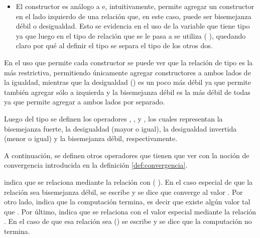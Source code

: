 \begin{itemize}[noitemsep]
\item El constructor  es análogo a  e, intuitivamente, permite agregar un constructor  en el lado izquierdo de una relación que, en este caso, puede ser bisemejanza débil o desigualdad. Esto se evidencia en el uso de la variable  que tiene tipo  ya que luego en el tipo de relación que se le pasa a  se utiliza ( ), quedando claro por qué al definir el tipo  se separa el tipo  de los otros dos. 
\end{itemize}

En el uso que permite cada constructor se puede ver que la relación de tipo  es la más restrictiva, permitiendo únicamente agregar constructores  a ambos lados de la igualdad, mientras que la desigualdad () es un poco más débil ya que permite también agregar sólo a izquierda y la bisemejanza débil es la más débil de todas ya que permite agregar a ambos lados por separado.

Luego del tipo  se definen los operadores \AgdaFunction{$\cong$}, \AgdaFunction{$\gtrsim$}, \AgdaFunction{$\lesssim$} y \AgdaFunction{$\approx$}, los cuales representan la bisemejanza fuerte, la desigualdad (mayor o igual), la desigualdad invertida (menor o igual) y la bisemejanza débil, respectivamente. 


A continuación, se definen otros operadores que tienen que ver con la noción de convergencia introducida en la definición \ref{def:convergencia}. 


 \AgdaFunction{$\Downarrow$[}  \AgdaFunction{]}  indica que  se relaciona mediante la relación  con ( ). En el caso especial de que la relación sea bisemejanza débil, se escribe  \AgdaFunction{$\Downarrow$}  y se dice que  converge al valor  \AgdaSymbol{:} . Por otro lado,  \AgdaFunction{$\Downarrow$} indica que la computación  termina, es decir que existe algún valor  tal que  \AgdaFunction{$\Downarrow$} . Por último,  \AgdaFunction{$\Uparrow$[}  \AgdaFunction{]} indica que  se relaciona con el valor especial  mediante la relación . En el caso de que esa relación sea () se escribe  \AgdaFunction{$\Uparrow$} y se dice que la computación  no termina.

